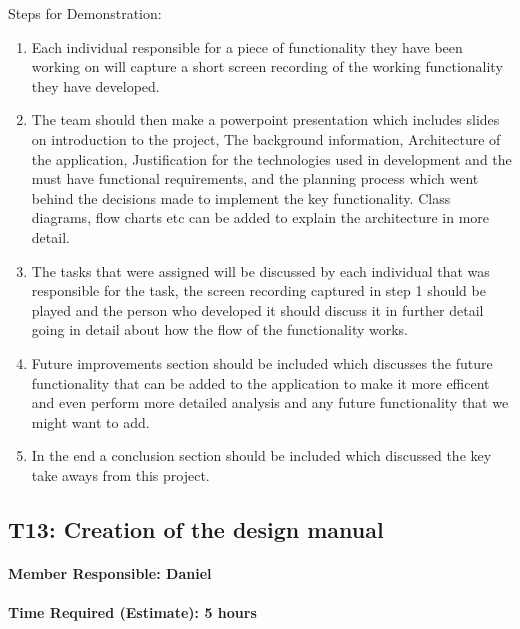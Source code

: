 \documentclass[
  english,
  paper=a4,
  oneside  ,captions=tableheading
]{scrbook}
\begin{document}
Steps for Demonstration:
\begin{enumerate}
	\item Each individual responsible for a piece of functionality they have been working on will capture a short screen recording of the working functionality they have developed.
	\item The team should then make a powerpoint presentation which includes slides on introduction to the project, The background information, Architecture of the application, Justification for the technologies used in development and the must have functional requirements, and the planning process which went behind the decisions made to implement the key functionality.  Class diagrams, flow charts etc can be added to explain the architecture in more detail.
	\item The tasks that were assigned will be discussed by each individual that was responsible for the task, the screen recording captured in step 1 should be played and the person who developed it should discuss it in further detail going in detail about how the flow of the functionality works.
	\item Future improvements section should be included which discusses the future functionality that can be added to the application to make it more efficent and even perform more detailed analysis and any future functionality that we might want to add.
	\item In the end a conclusion section should be included which discussed the key take aways from this project.
\end{enumerate}

\newpage
\hypertarget{t13-creation-of-the-design-manual}{%
\subsection{T13: Creation of the design
manual}\label{t13-creation-of-the-design-manual}}

\hypertarget{member-responsible-daniel-1}{%
\paragraph{Member Responsible:
Daniel}\label{member-responsible-daniel-1}}

\hypertarget{time-required-estimate-5-hours-1}{%
\paragraph{Time Required (Estimate): 5
hours}\label{time-required-estimate-5-hours-1}}
\end{document}
